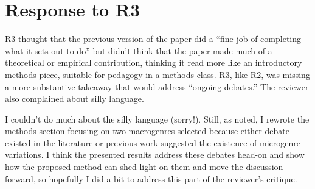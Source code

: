 \documentclass[a4paper,12pt]{extarticle}
\begin{document}
\section{Response to R3}
R3 thought that the previous version of the paper did a ``fine job of completing what it sets out to do'' but didn't think that the paper made much of a theoretical or empirical contribution, thinking it read more like an introductory methods piece, suitable for pedagogy in a methods class. R3, like R2, was missing a more substantive takeaway that would address ``ongoing debates.'' The reviewer also complained about silly language.

I couldn't do much about the silly language (sorry!). Still, as noted, I rewrote the methods section focusing on two macrogenres selected because either debate existed in the literature or previous work suggested the existence of microgenre variations. I think the presented results address these debates head-on and show how the proposed method can shed light on them and move the discussion forward, so hopefully I did a bit to address this part of the reviewer's critique. 
\end{document}
